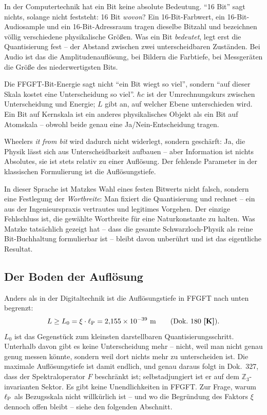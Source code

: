 In der Computertechnik hat ein Bit keine absolute Bedeutung.
\enquote{16 Bit} sagt nichts, solange nicht feststeht: 16 Bit \emph{wovon}?
Ein 16-Bit-Farbwert, ein 16-Bit-Audiosample und ein 16-Bit-Adressraum
tragen dieselbe Bitzahl und bezeichnen völlig verschiedene physikalische
Größen. Was ein Bit \emph{bedeutet}, legt erst die Quantisierung fest --
der Abstand zwischen zwei unterscheidbaren Zuständen. Bei Audio ist das
die Amplitudenauflösung, bei Bildern die Farbtiefe, bei Messgeräten die
Größe des niederwertigsten Bits.

\begin{tcolorbox}[ffgftbox, title={$\Ebit = \hbar c/L$ ist eine Auflösungstiefe}]
  Die FFGFT-Bit-Energie sagt nicht \enquote{ein Bit wiegt so viel},
  sondern \enquote{auf dieser Skala kostet eine Unterscheidung so viel}.
  $\hbar c$ ist der Umrechnungskurs zwischen Unterscheidung und Energie;
  $L$ gibt an, auf welcher Ebene unterschieden wird.
  Ein Bit auf Kernskala ist ein anderes physikalisches Objekt als ein Bit
  auf Atomskala -- obwohl beide genau eine Ja/Nein-Entscheidung tragen.
\end{tcolorbox}

Wheelers \emph{it from bit} wird dadurch nicht widerlegt, sondern
geschärft: Ja, die Physik lässt sich aus Unterscheidbarkeit aufbauen --
aber Information ist nichts Absolutes, sie ist stets relativ zu einer
Auflösung. Der fehlende Parameter in der klassischen Formulierung ist
die Auflösungstiefe.

In dieser Sprache ist Matzkes Wahl eines festen Bitwerts nicht falsch,
sondern eine Festlegung der \emph{Wortbreite}: Man fixiert die
Quantisierung und rechnet -- ein aus der Ingenieurspraxis vertrautes und
legitimes Vorgehen. Der einzige Fehlschluss ist, die gewählte Wortbreite
für eine Naturkonstante zu halten. Was Matzke tatsächlich gezeigt hat --
dass die gesamte Schwarzloch-Physik als reine Bit-Buchhaltung
formulierbar ist -- bleibt davon unberührt und ist das eigentliche
Resultat.

\subsection{Der Boden der Auflösung}

Anders als in der Digitaltechnik ist die Auflösungstiefe in FFGFT nach
unten begrenzt:
\begin{equation}
  L \geq L_0 = \xi\cdot\ell_{\mathrm{P}} = 2{,}155\times10^{-39}~\mathrm{m}
  \qquad \text{(Dok.~180 \textbf{[K]})}.
\end{equation}
$L_0$ ist das Gegenstück zum kleinsten darstellbaren Quantisierungsschritt.
Unterhalb davon gibt es keine Unterscheidung mehr -- nicht, weil man nicht
genau genug messen könnte, sondern weil dort nichts mehr zu unterscheiden
ist. Die maximale Auflösungstiefe ist damit endlich, und genau daraus
folgt in Dok.~327, dass der Spektraloperator $\hat F$ beschränkt ist;
selbstadjungiert ist er auf dem $\mathbb{Z}_3$-invarianten Sektor. Es gibt keine Unendlichkeiten in FFGFT.
Zur Frage, warum $\ell_{\mathrm{P}}$ als Bezugsskala nicht willkürlich ist -- und wo
die Begründung des Faktors $\xi$ dennoch offen bleibt -- siehe den
folgenden Abschnitt.


